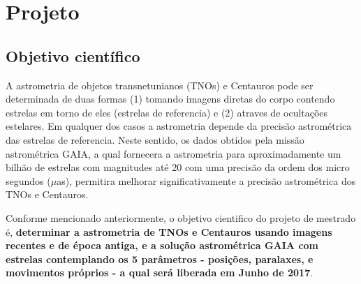 \documentclass[a4paper, 11pt]{article}
\begin{document}
\renewcommand{\figurename}{\textsc{Figura}}
\renewcommand{\tablename}{\textsc{Tabela}}
\renewcommand{\refname}{Refer\^encias}




\section{Projeto}

\subsection{Objetivo científico}

A astrometria de objetos transnetunianos (TNOs) e Centauros pode ser determinada de duas formas (1) tomando imagens diretas do corpo contendo estrelas em torno de eles (estrelas de referencia) e (2) atraves de ocultações estelares. Em qualquer dos casos a astrometria depende da precisão astrométrica das estrelas de referencia. Neste sentido, os dados obtidos pela missão astrométrica GAIA, a qual fornecera a astrometria para aproximadamente um bilhão de estrelas com magnitudes até 20 com uma precisão da ordem dos micro segundos ($\mu$as), permitira melhorar significativamente a precisão astrométrica dos TNOs e Centauros.

Conforme mencionado anteriormente, o objetivo cientifico do projeto de mestrado é, \textbf{determinar a astrometria de TNOs e Centauros usando imagens recentes e de época antiga, e a solução astrométrica GAIA com estrelas contemplando os 5 parâmetros - posições, paralaxes, e movimentos próprios - a qual será liberada em Junho de 2017}.
\end{document}
